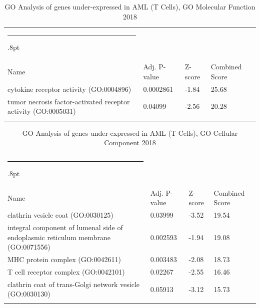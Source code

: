 \documentclass[3p,authoryear,preprint,12pt]{elsarticle}
\makeatletter
\def\hlinewd#1{%
  \noalign{\ifnum0=`}\fi\hrule \@height #1%
  \futurelet\reserved@a\@xhline}
\def\tbltoprule{\hlinewd{.8pt}\\[-12pt]}
\def\tblbottomrule{\noalign{\vspace*{6pt}}\hline\noalign{\vspace*{2pt}}}
\def\tblmidrule{\noalign{\vspace*{6pt}}\hline\noalign{\vspace*{2pt}}}
\makeatother
\begin{document}
\begin{table}[!htbp]
	\caption{{GO Analysis of genes under-expressed in AML (T Cells), GO Molecular Function 2018} }
	\label{tw-de478ae31lc6}
	\def\arraystretch{1}
	\ignorespaces 
	\centering 
	\begin{tabulary}{\linewidth}{p{\dimexpr.65\tabcolsep}p{\dimexpr.15\tabcolsep}p{\dimexpr.1\tabcolsep}p{\dimexpr.1\tabcolsep}}
		\tbltoprule Name & Adj. P-value & Z-score & Combined Score\\
		\tblmidrule
cytokine receptor activity (GO:0004896) & 0.0002861 & -1.84 & 25.68 \\
tumor necrosis factor-activated receptor activity (GO:0005031) & 0.04099 & -2.56 & 20.28 \\
		\tblbottomrule
	\end{tabulary}\par 
\end{table}
\begin{table}[!htbp]
	\caption{{GO Analysis of genes under-expressed in AML (T Cells), GO Cellular Component 2018} }
	\label{tw-de478ae31mc6}
	\def\arraystretch{1}
	\ignorespaces 
	\centering 
	\begin{tabulary}{\linewidth}{p{\dimexpr.65\tabcolsep}p{\dimexpr.15\tabcolsep}p{\dimexpr.1\tabcolsep}p{\dimexpr.1\tabcolsep}}
		\tbltoprule Name & Adj. P-value & Z-score & Combined Score\\
		\tblmidrule
clathrin vesicle coat (GO:0030125) & 0.03999 & -3.52 & 19.54 \\
integral component of lumenal side of endoplasmic reticulum membrane (GO:0071556) & 0.002593 & -1.94 & 19.08 \\
MHC protein complex (GO:0042611) & 0.003483 & -2.08 & 18.73 \\
T cell receptor complex (GO:0042101) & 0.02267 & -2.55 & 16.46 \\
clathrin coat of trans-Golgi network vesicle (GO:0030130) & 0.05913 & -3.12 & 15.73 \\
		\tblbottomrule
	\end{tabulary}\par 
\end{table}
\end{document}
